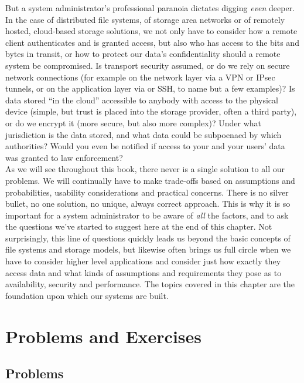But a system administrator's professional paranoia
dictates digging {\em even} deeper.  In the case of
distributed file systems, of storage area networks or
of remotely hosted, cloud-based storage solutions, we
not only have to consider how a remote client
authenticates and is granted access, but also who has
access to the bits and bytes in transit, or how to
protect our data's confidentiality should a remote
system be compromised.  Is transport security assumed,
or do we rely on secure network connections (for
example on the network layer via a VPN or
IPsec tunnels, or on the application
layer via  or
SSH, to name but a few examples)?  Is data
stored ``in the cloud'' accessible to anybody with
access to the physical device (simple, but trust is
placed into the storage provider, often a third
party), or do we encrypt it (more secure, but also
more complex)?  Under what jurisdiction is the data
stored, and what data could be subpoenaed by which
authorities?  Would you even
be notified if access to your and your users' data was
granted to law enforcement? \\

As we will see throughout this book, there never is a
single solution to all our problems.  We will
continually have to make trade-offs based on
assumptions and probabilities, usability
considerations and practical concerns.  There is no
silver bullet, no one solution, no unique, always
correct approach.  This is why it is so important for
a system administrator to be aware of {\em all} the
factors, and to ask the questions we've started to
suggest here at the end of this chapter.  Not
surprisingly, this line of questions quickly leads us
beyond the basic concepts of file systems and storage
models, but likewise often brings us full circle when
we have to consider higher level applications and
consider just how exactly they access data and what
kinds of assumptions and requirements they pose as to
availability, security and performance.  The topics
covered in this chapter are the foundation upon which
our systems are built.

\vfill
\pagebreak

\chapter*{Problems and Exercises}
\section*{Problems}

